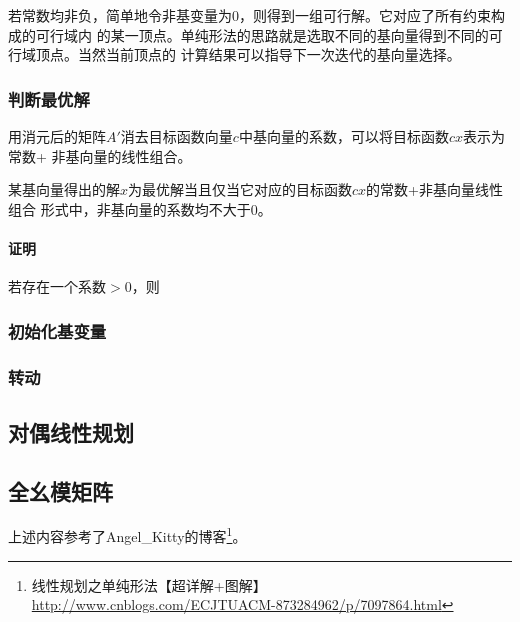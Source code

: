 若常数均非负，简单地令非基变量为0，则得到一组可行解。它对应了所有约束构成的可行域内
的某一顶点。单纯形法的思路就是选取不同的基向量得到不同的可行域顶点。当然当前顶点的
计算结果可以指导下一次迭代的基向量选择。
\subsubsection{判断最优解}
用消元后的矩阵$A'$消去目标函数向量$c$中基向量的系数，可以将目标函数$cx$表示为常数+
非基向量的线性组合。

\begin{theorem}
    某基向量得出的解$x$为最优解当且仅当它对应的目标函数$cx$的常数+非基向量线性组合
    形式中，非基向量的系数均不大于0。
\end{theorem}

\paragraph{证明} 若存在一个系数$>0$，则

\subsubsection{初始化基变量}
\subsubsection{转动}
\subsection{对偶线性规划}
\subsection{全幺模矩阵}
上述内容参考了Angel\_Kitty的博客\footnote{
    线性规划之单纯形法【超详解+图解】
    \url{http://www.cnblogs.com/ECJTUACM-873284962/p/7097864.html}
}。
